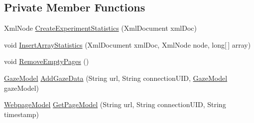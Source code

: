 \subsection*{Private Member Functions}
\begin{DoxyCompactItemize}
\item 
Xml\+Node \hyperlink{class_web_analyzer_1_1_models_1_1_data_model_1_1_test_model_aeb5429731ec41e1460952faf568e10be}{Create\+Experiment\+Statistics} (Xml\+Document xml\+Doc)
\item 
void \hyperlink{class_web_analyzer_1_1_models_1_1_data_model_1_1_test_model_a285dda9a94c63de7c47203f47e69e372}{Insert\+Array\+Statistics} (Xml\+Document xml\+Doc, Xml\+Node node, long\mbox{[}$\,$\mbox{]} array)
\item 
void \hyperlink{class_web_analyzer_1_1_models_1_1_data_model_1_1_test_model_a2fd8bf35c47c7fe3aee6537a1514ce10}{Remove\+Empty\+Pages} ()
\item 
\hyperlink{class_web_analyzer_1_1_models_1_1_data_model_1_1_gaze_model}{Gaze\+Model} \hyperlink{class_web_analyzer_1_1_models_1_1_data_model_1_1_test_model_ad58dc0c0e38b5663113167469c248796}{Add\+Gaze\+Data} (String url, String connection\+U\+I\+D, \hyperlink{class_web_analyzer_1_1_models_1_1_data_model_1_1_gaze_model}{Gaze\+Model} gaze\+Model)
\item 
\hyperlink{class_web_analyzer_1_1_models_1_1_data_model_1_1_webpage_model}{Webpage\+Model} \hyperlink{class_web_analyzer_1_1_models_1_1_data_model_1_1_test_model_a25af5415274c9119748a92459dac10da}{Get\+Page\+Model} (String url, String connection\+U\+I\+D, String timestamp)
\end{DoxyCompactItemize}
